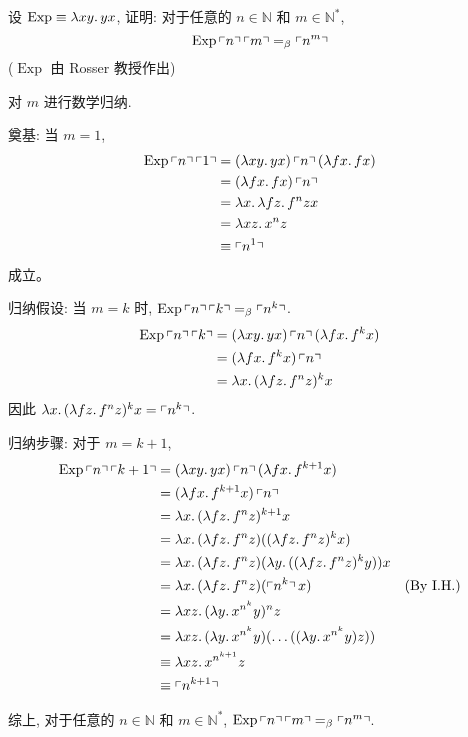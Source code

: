 \begin{problem}
设 $\operatorname{Exp} \equiv \lambda {xy}.\,{yx}$, 证明: 对于任意的 $n \in \mathbb{N}$ 和 $m \in \mathbb{N}^*$,
\[
\operatorname{Exp} \left\ulcorner n \right\urcorner \left\ulcorner m \right\urcorner =_\beta \left\ulcorner n^m \right\urcorner
\]
($\operatorname{Exp}$ 由 Rosser 教授作出)
\end{problem}

\begin{solution}
对 $m$ 进行数学归纳.

奠基: 当 $m = 1$, 
\begin{align*}
\operatorname{Exp} \left\ulcorner n \right\urcorner \left\ulcorner 1 \right\urcorner & = (\lambda {xy}.\,{yx}) \left\ulcorner n \right\urcorner (\lambda {fx}.\,{fx}) \\
& = (\lambda {fx}.\,{fx}) \left\ulcorner n \right\urcorner \\
& = \lambda {x}.\,{\lambda {fz}.\,{f^nz} x} \\
& = \lambda {xz}.\,{x^n z} \\
& \equiv \left\ulcorner n^1 \right\urcorner
\end{align*}
成立。

归纳假设: 当 $m = k$ 时, $\operatorname{Exp} \left\ulcorner n \right\urcorner \left\ulcorner k \right\urcorner =_\beta \left\ulcorner n^k \right\urcorner$.
\begin{align*}
\operatorname{Exp} \left\ulcorner n \right\urcorner \left\ulcorner k \right\urcorner & = (\lambda {xy}.\,{yx}) \left\ulcorner n \right\urcorner (\lambda {fx}.\,{f^kx}) \\
& = (\lambda {fx}.\,{f^kx}) \left\ulcorner n \right\urcorner \\
& = \lambda {x}.\,{(\lambda {fz}.\,{f^nz})^k x}
\end{align*}
因此 $\lambda {x}.\,{(\lambda {fz}.\,{f^nz})^k x} = \left\ulcorner n^k \right\urcorner$.

归纳步骤: 对于 $m = k + 1$,
\begin{align*}
\operatorname{Exp} \left\ulcorner n \right\urcorner \left\ulcorner k+1 \right\urcorner & = (\lambda {xy}.\,{yx}) \left\ulcorner n \right\urcorner (\lambda {fx}.\,{f^{k+1}x}) \\
& = (\lambda {fx}.\,{f^{k+1}x}) \left\ulcorner n \right\urcorner \\
& = \lambda {x}.\,{(\lambda {fz}.\,{f^n z})^{k+1} x} \\
& = \lambda {x}.\,{(\lambda {fz}.\,{f^n z})  ((\lambda {fz}.\,{f^n z})^k x)} \\
& = \lambda {x}.\,{(\lambda {fz}.\,{f^n z}) (\lambda {y}.\,{((\lambda {fz}.\,{f^n z})^k y)}) x} \\
& = \lambda {x}.\,{(\lambda {fz}.\,{f^n z}) (\left\ulcorner n^k \right\urcorner x}) & (\text{By I.H.}) \\
& = \lambda {xz}.\,{(\lambda {y}.\,{x^{n^k} y})^n z} \\
& = \lambda {xz}.\,{(\lambda {y}.\,{x^{n^k} y}) (\dots ((\lambda {y}.\,{x^{n^k} y}) z))} \\
& \equiv \lambda {xz}.\,{x^{n^{k+1}}z} \\
& \equiv \left\ulcorner n^{k+1} \right\urcorner
\end{align*}

综上, 对于任意的 $n \in \mathbb{N}$ 和 $m \in \mathbb{N}^*$, $\operatorname{Exp} \left\ulcorner n \right\urcorner \left\ulcorner m \right\urcorner =_\beta \left\ulcorner n^m \right\urcorner$.
\end{solution}
